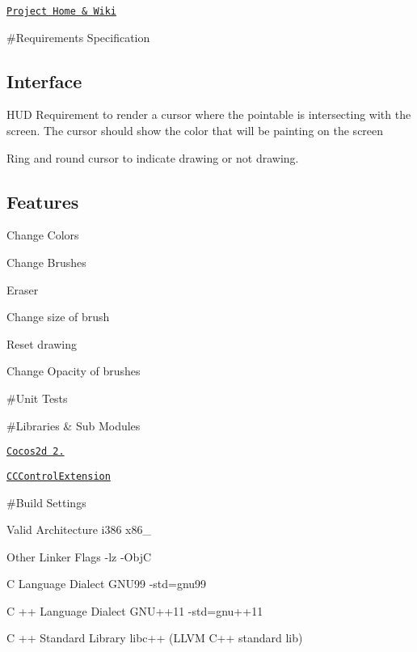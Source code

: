 \href{http://hci.montclair.edu/groups/leap/}{\tt Project Home \& Wiki}

\#\-Requirements Specification

\subsection*{Interface}


\begin{DoxyItemize}
\item H\-U\-D Requirement to render a cursor where the pointable is intersecting with the screen. The cursor should show the color that will be painting on the screen
\item Ring and round cursor to indicate drawing or not drawing.
\end{DoxyItemize}

\subsection*{Features}


\begin{DoxyItemize}
\item Change Colors
\item Change Brushes
\item Eraser
\item Change size of brush
\item Reset drawing
\item Change Opacity of brushes
\end{DoxyItemize}

\#\-Unit Tests

\#\-Libraries \& Sub Modules


\begin{DoxyItemize}
\item \href{http://www.cocos2d-iphone.org/}{\tt Cocos2d 2.}
\item \href{https://github.com/YannickL/CCControlExtension}{\tt C\-C\-Control\-Extension}
\item \#\-Build Settings
\end{DoxyItemize}


\begin{DoxyItemize}
\item Valid Architecture i386 x86\-\_
\item Other Linker Flags -\/lz -\/\-Obj\-C
\item C Language Dialect G\-N\-U99 -\/std=gnu99
\item C ++ Language Dialect G\-N\-U++11 -\/std=gnu++11
\item C ++ Standard Library libc++ (L\-L\-V\-M C++ standard lib)
\end{DoxyItemize}


